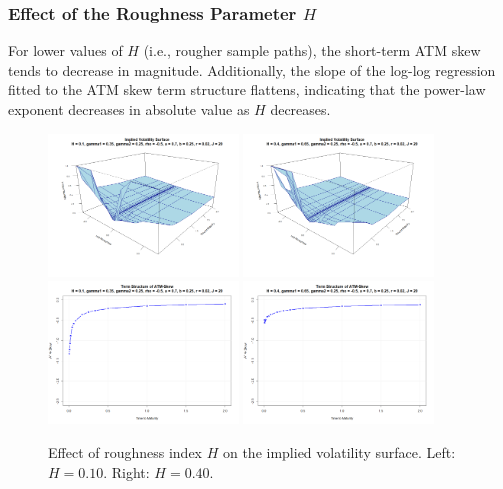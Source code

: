 \subsubsection*{Effect of the Roughness Parameter $H$}
For lower values of $H$ (i.e., rougher sample paths), the short-term ATM skew tends to decrease in magnitude. Additionally, the slope of the log-log regression fitted to the ATM skew term structure flattens, indicating that the power-law exponent decreases in absolute value as $H$ decreases.
\begin{figure}[H]
    \centering
    \includegraphics[width=0.45\textwidth]{figures/5.2 Individual Parameter Effects/H=0.10_iv_surface.png}
	\includegraphics[width=0.45\textwidth]{figures/5.2 Individual Parameter Effects/H=0.40_iv_surface.png}
	\includegraphics[width=0.45\textwidth]{figures/5.2 Individual Parameter Effects/H=0.10_atm_skew.png}
	\includegraphics[width=0.45\textwidth]{figures/5.2 Individual Parameter Effects/H=0.40_atm_skew.png}
    \caption{Effect of roughness index $H$ on the implied volatility surface. Left: $H=0.10$. Right: $H=0.40$.}
    \label{fig:H_effect}
\end{figure}

